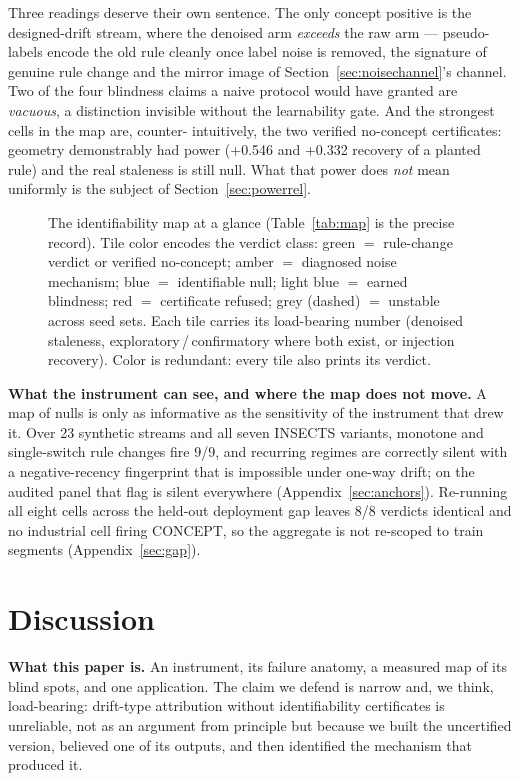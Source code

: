 \documentclass[10pt]{article} %
\begin{document}
Three readings deserve their own sentence. The only concept positive is the designed-drift stream,
where the denoised arm \emph{exceeds} the raw arm --- pseudo-labels encode the old rule cleanly once label
noise is removed, the signature of genuine rule change and the mirror image of Section~\ref{sec:noisechannel}'s channel. Two
of the four blindness claims a naive protocol would have granted are \emph{vacuous}, a distinction
invisible without the learnability gate. And the strongest cells in the map are, counter-
intuitively, the two verified no-concept certificates: geometry demonstrably had power (+0.546 and
+0.332 recovery of a planted rule) and the real staleness is still null. What that power does \emph{not}
mean uniformly is the subject of Section~\ref{sec:powerrel}.

\begin{figure}[t]
\centering
\resizebox{\textwidth}{!}{}
\caption{The identifiability map at a glance (Table~\ref{tab:map} is the precise record). Tile
color encodes the verdict class: green $=$ rule-change verdict or verified no-concept; amber $=$
diagnosed noise mechanism; blue $=$ identifiable null; light blue $=$ earned blindness; red $=$
certificate refused; grey (dashed) $=$ unstable across seed sets. Each tile carries its
load-bearing number (denoised staleness, exploratory\,/\,confirmatory where both exist, or
injection recovery). Color is redundant: every tile also prints its verdict.}
\label{fig:map}
\end{figure}

\textbf{What the instrument can see, and where the map does not move.} A map of nulls is only as
informative as the sensitivity of the instrument that drew it. Over 23 synthetic streams and all
seven INSECTS variants, monotone and single-switch rule changes fire 9/9, and recurring regimes are
correctly silent with a negative-recency fingerprint that is impossible under one-way drift; on the
audited panel that flag is silent everywhere (Appendix~\ref{sec:anchors}). Re-running all eight cells
across the held-out deployment gap leaves 8/8 verdicts identical and no industrial cell firing
CONCEPT, so the aggregate is not re-scoped to train segments (Appendix~\ref{sec:gap}).

\section{Discussion}\label{sec:discussion}

\textbf{What this paper is.} An instrument, its failure anatomy, a measured map of its blind spots, and
one application. The claim we defend is narrow and, we think, load-bearing: drift-type
attribution without identifiability certificates is unreliable, not as an argument from
principle but because we built the uncertified version, believed one of its outputs, and then
identified the mechanism that produced it.
\end{document}
